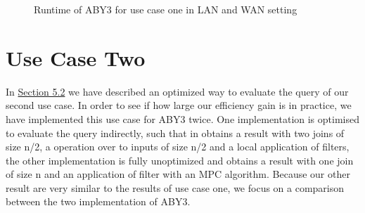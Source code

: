 \begin{figure}[H]
	\caption{Runtime of ABY3 for use case one in LAN and WAN setting}
\end{figure}

\section{Use Case Two} 
In \hyperref[use_case2]{Section 5.2} we have described an optimized way to evaluate the query of our second use case. In order to see if how large our efficiency gain is in practice, we have implemented this use case for ABY3 twice. One implementation is optimised to evaluate the query indirectly, such that in obtains a result with two joins of size n/2, a  operation over to inputs of size n/2 and a local application of filters, the other implementation is fully unoptimized and obtains a result with one join of size n and  an application of filter with an MPC algorithm. Because our other result are very similar to the results of use case one, we focus on a comparison between the two implementation of ABY3. 
